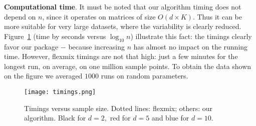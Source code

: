 \noindent \textbf{Computational time}.
It must be noted that our algorithm timing does not depend on $n$, since it operates on matrices of size $O(d \times K)$.
Thus it can be more suitable for very large datasets, where the variability is clearly reduced. Figure~\ref{timing} (time by seconds versus $\log_{10}n$) illustrate this fact: the timings clearly favor our package $-$ because increasing $n$
has almost no impact on the running time. However, flexmix timings are not that high:
just a few minutes for the longest run, on average, on one million sample points.
To obtain the data shown on the figure we averaged $1000$ runs on random parameters.\\

\begin{figure}
\centering
	\texttt{[image: timings.png]}
	\caption{Timings versus sample size. Dotted lines: flexmix; others: our algorithm. Black for $d=2,$ red for $d=5$ and blue for $d=10.$}
	\label{timing}
\end{figure}


%
%
